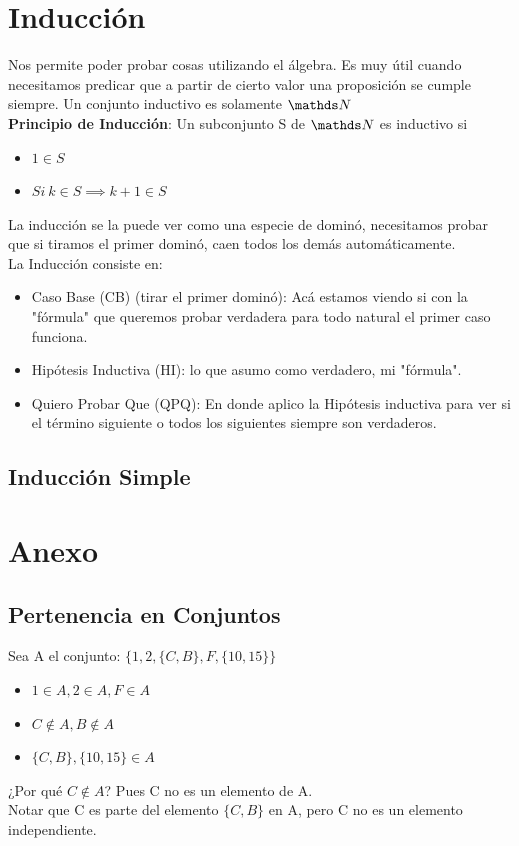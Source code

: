 \documentclass[10pt,a4paper]{article}
\begin{document}
\section*{Inducción}
Nos permite poder probar cosas utilizando el álgebra. Es muy útil cuando necesitamos predicar que a partir de cierto valor una proposición se cumple siempre. Un conjunto inductivo es solamente $\nat$ \\
\textbf{Principio de Inducción}: Un subconjunto S de $\nat$ es inductivo si 
\begin{itemize}
    \item $1 \in S$
    \item $Si \ k \in S \implies k+1 \in S$
\end{itemize}
La inducción se la puede ver como una especie de dominó, necesitamos probar que si tiramos el primer dominó, caen todos los demás automáticamente. \\
La Inducción consiste en: 
\begin{itemize}
    \item Caso Base (CB) (tirar el primer dominó): Acá estamos viendo si con la "fórmula" que queremos probar verdadera para todo natural el primer caso funciona.
    \item Hipótesis Inductiva (HI): lo que asumo como verdadero, mi "fórmula".
    \item Quiero Probar Que (QPQ): En donde aplico la Hipótesis inductiva para ver si el término siguiente o todos los siguientes siempre son verdaderos.
\end{itemize}
\subsection*{Inducción Simple}

\section*{Anexo}
\subsection*{Pertenencia en Conjuntos}
\label{subsec:pertenecencia_conjuntos}
Sea A el conjunto: $\{1, 2, \{C, B\}, F, \{10, 15\}\}$
\begin{itemize}
    \item $ 1 \in A, 2 \in A, F \in A $
    \item $ C \notin A, B \notin A $
    \item $  \{C, B\}, \{10, 15\} \in A $
\end{itemize}
¿Por qué $C \notin A$? Pues C no es un elemento de A.\\ Notar que C es parte del elemento $\{C, B\}$ en A, pero C no es un elemento independiente.
\end{document}

